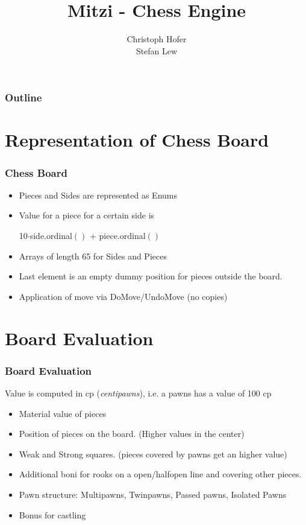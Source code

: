 \documentclass [12pt ,a4paper, british]{beamer}
\author{Christoph Hofer \\ Stefan Lew}
\title{Mitzi - Chess Engine}
\theoremstyle{plain}
\theoremstyle{definition}
\begin{document}
	\begin{frame}
		\maketitle
	\end{frame}
	
	\begin{frame}
		\frametitle{Outline}
    \small
    \tableofcontents
	\end{frame}

	\section{Representation of Chess Board}
	\begin{frame}
		\frametitle{Chess Board}
		\begin{itemize}
			\item Pieces and Sides are represented as Enums
			\item Value for a piece for a certain side is
				\begin{center}
					10$\cdot$side.ordinal$()$ + piece.ordinal$()$
				\end{center}
			\item Arrays of length 65 for Sides and Pieces 
			\item Last element is an empty dummy position for pieces outside the board.
			\item Application of move via DoMove/UndoMove (no copies)
		\end{itemize}
	\end{frame}
	
	\section{Board Evaluation}
	\begin{frame}
		\frametitle{Board Evaluation}
		Value is computed in cp (\emph{centipawns}), i.e. a pawns has a value of 100 cp
		\begin{itemize}
			\item Material value of pieces
			\item Position of pieces on the board. (Higher values in the center)
			\item Weak and Strong squares. (pieces covered by pawns get an higher value)
			\item Additional boni for rooks on a open/halfopen line and covering other pieces.
			\item Pawn structure: Multipawns, Twinpawns, Passed pawns, Isolated Pawns
			\item Bonus for castling
		\end{itemize}
	\end{frame}
\end{document}

